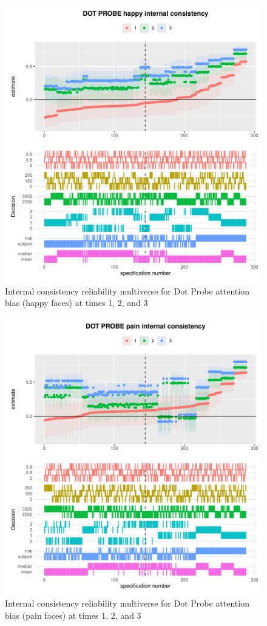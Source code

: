 \documentclass[
  english,
  man,floatsintext]{apa6}
\begin{document}
\begin{figure}
\centering
\includegraphics{half_trials_files/figure-latex/unnamed-chunk-10-1.pdf}
\caption{\label{fig:unnamed-chunk-10}Internal consistency reliability multiverse for Dot Probe attention bias (happy faces) at times 1, 2, and 3}
\end{figure}

\begin{figure}
\centering
\includegraphics{half_trials_files/figure-latex/unnamed-chunk-11-1.pdf}
\caption{\label{fig:unnamed-chunk-11}Internal consistency reliability multiverse for Dot Probe attention bias (pain faces) at times 1, 2, and 3}
\end{figure}
\end{document}
